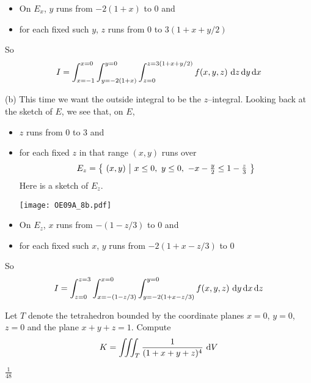 \begin{solution}
\begin{itemize}
\item
On $E_x$, $y$ runs from $-2(1+x)$ to $0$ and
\item
for each fixed such $y$, $z$ runs from $0$ to $3(1+x+y/2)$
\end{itemize}
So
\begin{align*}
I = \int_{x=-1}^{x=0}\int_{y=-2(1+x)}^{y=0}\int_{z=0}^{z=3(1+x+y/2)} f(x,y,z)\ 
                                      \dee{z}\,\dee{y}\,\dee{x}
\end{align*}

(b) This time we want the outside integral to be the $z$--integral.
Looking back at the sketch of $E$, we see that, on $E$,
\begin{itemize}
\item 
$z$ runs from $0$ to $3$ and
\item
for each fixed $z$ in that range $(x,y)$ runs over
\begin{align*}
E_z=\big\{ \ (x,y)\ \big|\ x\le 0,\ y\le 0,\ -x-\tfrac{y}{2}\le 1-\tfrac{z}{3}\ \big\}
\end{align*}
Here is a sketch of $E_z$.
\begin{center}
     \texttt{[image: OE09A\_8b.pdf]}
\end{center}

\item
On $E_z$, $x$ runs from $-(1-z/3)$ to $0$ and
\item
for each fixed such $x$, $y$ runs from $-2(1+x-z/3)$ to $0$
\end{itemize}
So
\begin{align*}
I = \int_{z=0}^{z=3}\int_{x=-(1-z/3)}^{x=0}\int_{y=-2(1+x-z/3)}^{y=0} f(x,y,z)\ 
                                      \dee{y}\,\dee{x}\,\dee{z}
\end{align*}
\end{solution}

\begin{question}[M200 2010D] %
Let $T$ denote the tetrahedron bounded by the coordinate planes $x = 0$, $y = 0$, $z = 0$ and
the plane $x + y + z = 1$. Compute
\begin{equation*}
K = \iiint_T \frac{1}{ (1 + x + y + z)^4}\ \mathrm{d}V
\end{equation*}
\end{question}

%

\begin{answer}
$\frac{1}{48}$
\end{answer}

